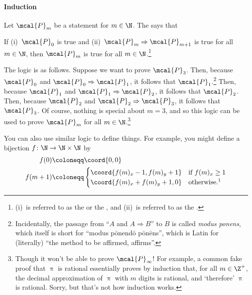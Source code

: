 \paragraph{Induction} Let $\mcal{P}_m$ be a statement for $m\in \N$.  The  says that
\begin{important}
If (i)~$\mcal{P}_0$ is true and (ii)~$\mcal{P}_m\Rightarrow \mcal{P}_{m+1}$ is true for all $m\in \N$, then $\mcal{P}_m$ is true for all $m\in \N$.\footnote{(i)~is referred to as the  or the , and (ii)~is referred to as the .}
\end{important}
The logic is as follows.  Suppose we want to prove $\mcal{P}_3$.  Then, because $\mcal{P}_0$ and $\mcal{P}_0\Rightarrow \mcal{P}_1$, it follows that $\mcal{P}_1$.\footnote{Incidentally, the passage from ``$A$ and $A\Rightarrow B$'' to $B$ is called \emph{modus ponens}, which itself is short for ``modus pōnendō pōnēns'', which is Latin for (literally) ``the method to be affirmed, affirms''.}  Then, because $\mcal{P}_1$ and $\mcal{P}_1\Rightarrow \mcal{P}_2$, it follows that $\mcal{P}_2$.  Then, because $\mcal{P}_2$ and $\mcal{P}_2\Rightarrow \mcal{P}_3$, it follows that $\mcal{P}_3$.  Of course, nothing is special about $m=3$, and so this logic can be used to prove $\mcal{P}_m$ for all $m\in \N$.\footnote{Though it won't be able to prove $\mcal{P}_{\infty}$!  For example, a common fake proof that $\uppi$ is rational essentially proves by induction that, for all $m\in \Z ^+$, the decimal approximation of $\uppi$ with $m$ digits is rational, and `therefore' $\uppi$ is rational.  Sorry, but that's not how induction works.}

You can also use similar logic to define things.  For example, you might define a bijection $f\colon \N \rightarrow \N \times \N$ by
\begin{equation}
\begin{split}
f(0) & \coloneqq \coord{0,0} \\
f(m+1) & \coloneqq \begin{cases}\coord{f(m)_x-1,f(m)_y+1} & \text{if }f(m)_x\geq 1 \\ \coord{f(m)_x+f(m)_y+1,0} & \text{otherwise.\footnotemark}\end{cases}
\end{split}
\end{equation}

